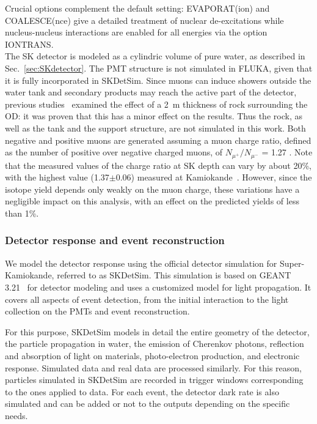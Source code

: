 Crucial options complement the default setting: EVAPORAT(ion) and COALESCE(nce) give a detailed treatment of nuclear de-excitations while nucleus-nucleus interactions are enabled for all energies via the option IONTRANS.
\vspace{.3cm}\\
The SK detector is modeled as a cylindric volume of pure water, as described in Sec.~\ref{sec:SKdetector}. The PMT structure is not simulated in FLUKA, given that it is fully incorporated in SKDetSim. Since muons can induce showers outside the water tank and secondary products may reach the active part of the detector, previous studies~\cite{BLi_1} examined the effect of a 2~m thickness of rock surrounding the OD:  it was proven that this has a minor effect on the results. Thus the rock,  as well as the tank and the support structure, are not simulated in this work. Both negative and positive muons are generated assuming a muon charge ratio, defined as the number of positive over negative charged muons, of $N_{\mu^+}/N_{\mu^-}$ = 1.27 \cite{CMSchargeratio}. Note that the measured values of the charge ratio at SK depth  can vary by about 20\%, with the highest value (1.37$\pm$0.06) measured at Kamiokande~\cite{Yamada:1991aq}. However, since the isotope yield depends only weakly on the muon charge, these variations have a negligible impact on this analysis, with an effect on the predicted yields of less than 1\%.

\subsubsection{Detector response and event reconstruction}


We model the detector response using the official detector simulation for Super-Kamiokande, referred to as SKDetSim. This simulation is based on GEANT 3.21~\cite{geant3} for detector modeling and uses a customized model for light propagation. It covers all aspects of event detection, from the initial interaction to the light collection on the PMTs and event reconstruction.

For this purpose, SKDetSim models in detail the entire geometry of the detector, the particle propagation in water, the emission of Cherenkov photons, reflection and absorption of light on materials, photo-electron production, and electronic response. Simulated data and real data are processed similarly. For this reason, particles simulated in SKDetSim are recorded in trigger windows corresponding to the ones applied to data. For each event, the detector dark rate is also simulated and can be added or not to the outputs depending on the specific needs.


